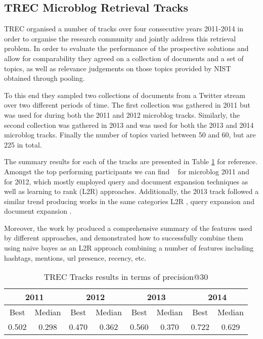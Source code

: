 \subsection{TREC Microblog Retrieval Tracks}
TREC organised a number of tracks over four consecutive years 2011-2014 in order to organise the research community and jointly address this retrieval problem. In order to evaluate the performance of the prospective solutions and allow for comparability they agreed on a collection of documents and a set of topics, as well as relevance judgements on those topics provided by NIST obtained through pooling.

To this end they sampled two collections of documents from a Twitter stream over two different periods of time. The first collection was gathered in 2011 but was used for during both the 2011 and 2012 microblog tracks. Similarly, the second collection was gathered in 2013 and was used for both the 2013 and 2014 microblog tracks. Finally the number of topics varied between 50 and 60, but are 225 in total.

The summary results for each of the tracks are presented in Table \ref{summarytrec} for reference. Amongst the top performing participants we can find ~\cite{amati2011fub,li2011pris,metzler2011usc} for microblog 2011 and ~\cite{kimovercoming,younosFreq,hanhit} for 2012, which mostly employed query and document expansion techniques as well as learning to rank (L2R) approaches.
Additionally, the 2013 track followed a similar trend producing works in the same categories L2R \cite{pris2013,gaoictnet}, query expansion \cite{prebjut,perezuniversity} and document expansion \cite{jabeuririt}.

Moreover, the work by \cite{Damak:2013:ESF:2480362.2480537} produced a comprehensive summary of the features used by different approaches, and demonstrated how to successfully combine them using naive bayes as an L2R approach combining a number of features including hashtags, mentions, url presence, recency, etc.

\begin{table}[]
	\centering
	
	\caption{TREC Tracks results in terms of precision@30}
	
	\begin{tabular}{|c|c|c|c|c|c|c|c|}
		\hline
		\multicolumn{2}{|c|}{2011} &\multicolumn{2}{|c|}{2012} & \multicolumn{2}{|c|}{2013} & \multicolumn{2}{|c|}{2014} \\
		\hline
		Best & Median & Best & Median &	Best & Median &	Best & Median \\
		0.502 & 0.298 & 0.470 & 0.362 & 0.560 & 0.370 & 0.722 & 0.629 \\
		\hline
		
	\end{tabular}
	
	\label{summarytrec}
	\vspace{0.5cm}
\end{table}

